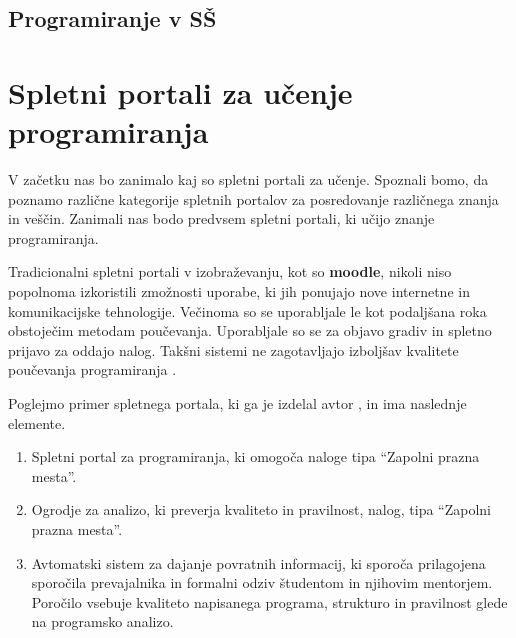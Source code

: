 \subsection{Programiranje v SŠ}
\label{sec:Programiranje_v_SŠ}


\section{Spletni portali za učenje programiranja}
\label{sec:SPUP}


V začetku nas bo zanimalo kaj so spletni portali za učenje. Spoznali
bomo, da poznamo različne kategorije spletnih portalov za posredovanje
različnega znanja in veščin. Zanimali nas bodo  predvsem spletni
portali, ki učijo znanje programiranja.

Tradicionalni spletni portali v izobraževanju, kot so \textbf{moodle},
nikoli niso popolnoma izkoristili zmožnosti uporabe, ki jih ponujajo
nove internetne in komunikacijske tehnologije. Večinoma so se
uporabljale le kot podaljšana roka obstoječim metodam
poučevanja. Uporabljale so se za objavo gradiv in spletno prijavo za
oddajo nalog. Takšni sistemi ne zagotavljajo izboljšav kvalitete
poučevanja programiranja \cite{ITaLCP_DistanceEdu}.


Poglejmo primer spletnega portala, ki ga je izdelal avtor
\cite{thesisAWebP}, in ima naslednje elemente.

\begin{enumerate}
\def\labelenumi{\arabic{enumi}.}
\item
  Spletni portal za programiranja, ki omogoča naloge tipa ``Zapolni
  prazna mesta''.
\item
  Ogrodje za analizo, ki preverja kvaliteto in pravilnost, nalog, tipa
  ``Zapolni prazna mesta''.
\item
  Avtomatski sistem za dajanje povratnih informacij, ki sporoča
  prilagojena sporočila prevajalnika in formalni odziv študentom in
  njihovim mentorjem. Poročilo vsebuje kvaliteto napisanega programa,
  strukturo in pravilnost glede na programsko analizo.
\end{enumerate}

